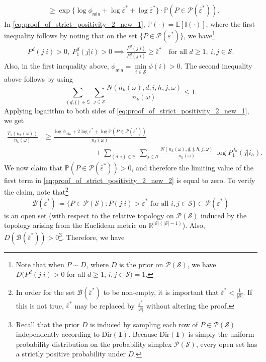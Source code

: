 \begin{itemize}
{\begin{align}
	&\geq \exp\bigg\lbrace\log \phi_{\textsf{min}}+\log \bar{\varepsilon}^*+\log \bar{\varepsilon}^*\bigg\rbrace\cdot \mathbb{P}(P\in \mathscr{P}(\bar{\varepsilon}^*)).
	\label{eq:proof_of_strict_positivity_2_new_1}
\end{align} 
{\color{black} In \eqref{eq:proof_of_strict_positivity_2_new_1}, $\mathbb{P}(\cdot)=\mathbb{E}[\mathbb{I}(\cdot)]$,} where the first inequality follows by noting that on the set $\{P\in \mathscr{P}(\bar{\varepsilon}^*)\}$, we have\footnote{Note that when $P\sim D$, where $D$ is the prior on $\mathscr{P}(\mathcal{S})$, we have $D(P^d(j|i)>0$ for all $d\geq 1$, $i, j\in \mathcal{S})=1$.} 
\begin{align*}
	P^d(j|i)>0,~ P_1^d(j|i)>0 \implies \frac{P^d(j|i)}{P_1^d(j|i)}\geq \bar{\varepsilon}^* \quad \text{for all }d\geq 1, ~i, j\in \mathcal{S}. 
\end{align*}
 Also, in the first inequality above, $\phi_{\textsf{min}}=\min\limits_{i\in\mathcal{S}}\phi(i)>0$. The second inequality above follows by using $$ \sum\limits_{(\underline{d}, \underline{i})\in \mathbb{S}}~\sum\limits_{j\in \mathcal{S}}\frac{N(n_k(\omega), \underline{d}, \underline{i}, h, j, \omega)}{n_k(\omega)} \leq 1. $$
 Applying logarithm to both sides of \eqref{eq:proof_of_strict_positivity_2_new_1}, we get
 \begin{align}
 	\frac{T_1(n_k(\omega))}{n_k(\omega)}&\geq \frac{\log \phi_{\textsf{min}}+2\log \bar{\varepsilon}^*+\log \mathbb{P}(P\in \mathscr{P}(\bar{\varepsilon}^*))}{n_k(\omega)}\nonumber\\
	&\hspace{3cm}+\sum\limits_{(\underline{d}, \underline{i})\in \mathbb{S}}~\sum\limits_{j\in \mathcal{S}}\frac{N(n_k(\omega), \underline{d}, \underline{i}, h, j, \omega)}{n_k(\omega)}~ \log P_1^{d_h}(j|i_h).
 	\label{eq:proof_of_strict_positivity_2_new_2}
 \end{align}
 We now claim that $\mathbb{P}(P\in \mathscr{P}(\bar{\varepsilon}^*))>0$, and therefore the limiting value of the first term in \eqref{eq:proof_of_strict_positivity_2_new_2} is equal to zero. To verify the claim, note that\footnote{In order for the set $\mathscr{B}(\bar{\varepsilon}^*)$ to be non-empty, it is important that $\bar{\varepsilon}^* < \frac{1}{|\mathcal{S}|}$. If this is not true, $\bar{\varepsilon}^*$ may be replaced by $\frac{\bar{\varepsilon}^*}{|\mathcal{S}|}$ without altering the proof.} $$ \mathscr{B}(\bar{\varepsilon}^*)\coloneqq \bigg\lbrace P\in \mathscr{P}(\mathcal{S}):P(j|i)> \bar{\varepsilon}^*\text{ for all }i, j\in \mathcal{S}\bigg\rbrace \subset \mathscr{P}(\bar{\varepsilon}^*)$$ is an open set (with respect to the relative topology on $\mathscr{P}(\mathcal{S})$ induced by the topology arising from the Euclidean metric on $\mathbb{R}^{|\mathcal{S}|(|\mathcal{S}|-1)}$). Also, $D(\mathscr{B}(\bar{\varepsilon}^*))>0$\footnote{Recall that the prior $D$ is induced by sampling each row of $P\in \mathscr{P}(\mathcal{S})$ independently according to $\text{Dir}(\mathbf{1})$. Because $\text{Dir}(\mathbf{1})$ is simply the uniform probability distribution on the probability simplex $\mathscr{P}(\mathcal{S})$, every open set has a strictly positive probability under $D$.}. Therefore, we have
}
\end{itemize}
